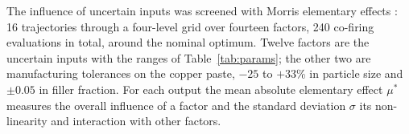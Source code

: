 The influence of uncertain inputs was screened with Morris elementary effects \cite{morris1991factorial}: 16 trajectories through a four-level grid over fourteen factors, 240 co-firing evaluations in total, around the nominal optimum. Twelve factors are the uncertain inputs with the ranges of Table~\ref{tab:params}; the other two are manufacturing tolerances on the copper paste, $-25$ to $+33$\% in particle size and $\pm0.05$ in filler fraction. For each output the mean absolute elementary effect $\mu^*$ measures the overall influence of a factor and the standard deviation $\sigma$ its non-linearity and interaction with other factors.
